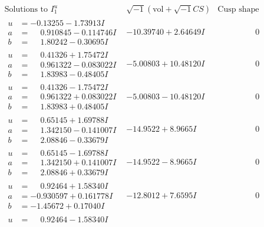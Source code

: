 \documentclass[1p]{elsarticle_modified}
\theoremstyle{definition}
\newcommand{\I}{\sqrt{-1}}
\begin{document}
$$\begin{array}{c|c|c}
\text{Solutions to }I^u_{1}& \I (\text{vol} + \sqrt{-1}CS) & \text{Cusp shape}\\
 \hline 
\begin{aligned}
u &= -0.13255 - 1.73913 I \\
a &= \phantom{-}0.910845 - 0.114746 I \\
b &= \phantom{-}1.80242 - 0.30695 I\end{aligned}
 & -10.39740 + 2.64649 I & \phantom{-0.000000 } 0 \\ \hline\begin{aligned}
u &= \phantom{-}0.41326 + 1.75472 I \\
a &= \phantom{-}0.961322 - 0.083022 I \\
b &= \phantom{-}1.83983 - 0.48405 I\end{aligned}
 & -5.00803 + 10.48120 I & \phantom{-0.000000 } 0 \\ \hline\begin{aligned}
u &= \phantom{-}0.41326 - 1.75472 I \\
a &= \phantom{-}0.961322 + 0.083022 I \\
b &= \phantom{-}1.83983 + 0.48405 I\end{aligned}
 & -5.00803 - 10.48120 I & \phantom{-0.000000 } 0 \\ \hline\begin{aligned}
u &= \phantom{-}0.65145 + 1.69788 I \\
a &= \phantom{-}1.342150 - 0.141007 I \\
b &= \phantom{-}2.08846 - 0.33679 I\end{aligned}
 & -14.9522 + 8.9665 I & \phantom{-0.000000 } 0 \\ \hline\begin{aligned}
u &= \phantom{-}0.65145 - 1.69788 I \\
a &= \phantom{-}1.342150 + 0.141007 I \\
b &= \phantom{-}2.08846 + 0.33679 I\end{aligned}
 & -14.9522 - 8.9665 I & \phantom{-0.000000 } 0 \\ \hline\begin{aligned}
u &= \phantom{-}0.92464 + 1.58340 I \\
a &= -0.930597 + 0.161778 I \\
b &= -1.45672 + 0.17040 I\end{aligned}
 & -12.8012 + 7.6595 I & \phantom{-0.000000 } 0 \\ \hline\begin{aligned}
u &= \phantom{-}0.92464 - 1.58340 I \\

\end{aligned}
\end{array}$$
\end{document}
